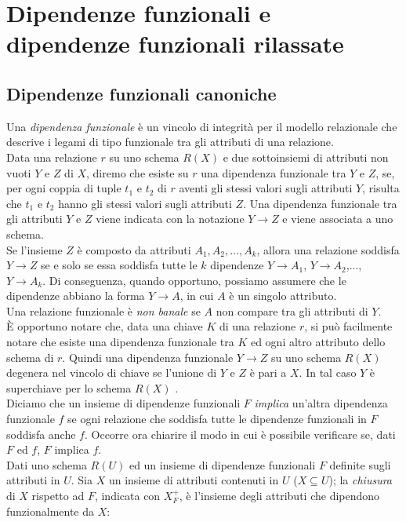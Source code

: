 \documentclass[11pt]{article}
\begin{document}
\section{Dipendenze funzionali e dipendenze funzionali rilassate}
\subsection{Dipendenze funzionali canoniche}
Una \textit{dipendenza funzionale} è un vincolo di integrità per il modello relazionale che descrive i legami di tipo funzionale tra gli attributi di una relazione. \\
Data una relazione $r$ su uno schema $R(X)$ e due sottoinsiemi di attributi non vuoti $Y$ e $Z$ di $X$, diremo che esiste su $r$ una dipendenza funzionale tra $Y$ e $Z$, se, per ogni coppia di tuple $t_1$ e $t_2$ di $r$ aventi gli stessi valori sugli attributi $Y$, risulta che $t_1$ e $t_2$ hanno gli stessi valori sugli attributi $Z$. Una dipendenza funzionale tra gli attributi $Y$ e $Z$ viene indicata con la notazione $Y \rightarrow Z$ e viene associata a uno schema. \\
Se l'insieme $Z$ è composto da attributi $A_1, A_2, \ldots, A_k$, allora una relazione soddisfa $Y \rightarrow Z$ se e solo se essa soddisfa tutte le $k$ dipendenze $Y \rightarrow A_1$, $Y \rightarrow A_2$,..., $Y \rightarrow A_k$. Di conseguenza, quando opportuno, possiamo assumere che le dipendenze abbiano la forma $Y \rightarrow A$, in cui $A$ è un singolo attributo. \\
Una relazione funzionale è \textit{non banale} se $A$ non compare tra gli attributi di $Y$. \\
È opportuno notare che, data una chiave $K$ di una relazione $r$, si può facilmente notare che esiste una dipendenza funzionale tra $K$ ed ogni altro attributo dello schema di $r$. Quindi una dipendenza funzionale $Y \rightarrow Z$ su uno schema $R(X)$ degenera nel vincolo di chiave se l'unione di $Y$ e $Z$ è pari a $X$. In tal caso $Y$ è superchiave per lo schema $R(X)$ . \\
Diciamo che un insieme di dipendenze funzionali $F$ \textit{implica} un'altra dipendenza funzionale $f$ se ogni relazione che soddisfa tutte le dipendenze funzionali in $F$ soddisfa anche $f$. Occorre ora chiarire il modo in cui è possibile verificare se, dati $F$ ed $f$, $F$ implica $f$. \\
Dati uno schema $R(U)$ ed un insieme di dipendenze funzionali $F$ definite sugli attributi in $U$. Sia $X$ un insieme di attributi contenuti in $U$ ($X \subseteq U$); la \textit{chiusura} di $X$ rispetto ad $F$, indicata con $X^{+}_F$, è l'insieme degli attributi che dipendono funzionalmente da $X$:
\end{document}
